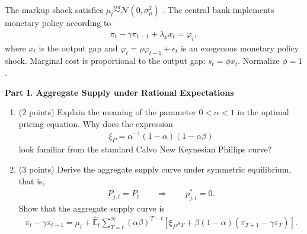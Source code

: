 \documentclass[12pt]{article}
\begin{document}
\begin{enumerate}[label=\arabic*.]
    The markup shock satisfies $\mu_t\overset{iid}{\sim}\mathcal N(0,\sigma_\mu^2)$
    .
    The central bank implements monetary policy according to
    \begin{align*}
        \pi_t-\gamma\pi_{t-1}+\lambda_x x_t=\varphi_t,
    \end{align*}
    where $x_t$ is the output gap and $\varphi_t=\rho\varphi_{t-1}+\epsilon_t$ is an exogenous monetary policy shock. Marginal cost is proportional to the output gap: $s_t=\phi x_t$. Normalize $\phi=1$.
    
    \textbf{Part I. Aggregate Supply under Rational Expectations}
    
    \begin{enumerate}[label=(\alph*)]
    
        \item (2 points)
        Explain the meaning of the parameter $0<\alpha<1$ in the optimal pricing equation.
        Why does the expression
        \begin{align*}
            \xi_P=\alpha^{-1}(1-\alpha)(1-\alpha\beta)
        \end{align*}
        look familiar from the standard Calvo New Keynesian Phillips curve?
    
        \item (3 points)
        Derive the aggregate supply curve under symmetric equilibrium, that is,
        \begin{align*}
            P_{j,t}=P_t
            \qquad\Rightarrow\qquad
            p^*_{j,t}=0.
        \end{align*}
        Show that the aggregate supply curve is
        \begin{align*}
            \pi_t-\gamma\pi_{t-1}
            =
            \mu_t
            +
            \hat{\mathbb{E}}_{t}
            \sum_{T=t}^{\infty}
            (\alpha\beta)^{T-t}
            \left[
            \xi_P s_T
            +
            \beta(1-\alpha)(\pi_{T+1}-\gamma\pi_T)
            \right].
        \end{align*}
    

\end{enumerate}
\end{enumerate}
\end{document}
